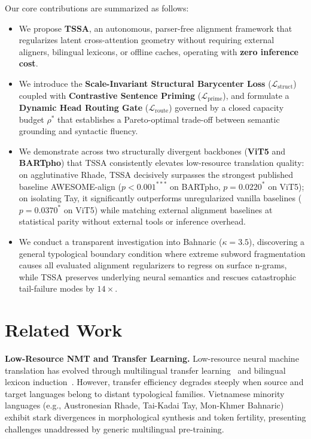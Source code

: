 \documentclass[11pt]{article}
\begin{document}
Our core contributions are summarized as follows:
\begin{itemize}[leftmargin=*]
    \item We propose \textbf{TSSA}, an autonomous, parser-free alignment framework that regularizes latent cross-attention geometry without requiring external aligners, bilingual lexicons, or offline caches, operating with \textbf{zero inference cost}.
    \item We introduce the \textbf{Scale-Invariant Structural Barycenter Loss} ($\mathcal{L}_{\text{struct}}$) coupled with \textbf{Contrastive Sentence Priming} ($\mathcal{L}_{\text{prime}}$), and formulate a \textbf{Dynamic Head Routing Gate} ($\mathcal{L}_{\text{route}}$) governed by a closed capacity budget $\rho^*$ that establishes a Pareto-optimal trade-off between semantic grounding and syntactic fluency.
    \item We demonstrate across two structurally divergent backbones (\textbf{ViT5} and \textbf{BARTpho}) that TSSA consistently elevates low-resource translation quality: on agglutinative Rhade, TSSA decisively surpasses the strongest published baseline AWESOME-align ($p < 0.001^{\ast\ast\ast}$ on BARTpho, $p = 0.0220^*$ on ViT5); on isolating Tay, it significantly outperforms unregularized vanilla baselines ($p = 0.0370^*$ on ViT5) while matching external alignment baselines at statistical parity without external tools or inference overhead.
    \item We conduct a transparent investigation into Bahnaric ($\kappa = 3.5$), discovering a general typological boundary condition where extreme subword fragmentation causes all evaluated alignment regularizers to regress on surface n-grams, while TSSA preserves underlying neural semantics and rescues catastrophic tail-failure modes by $14\times$.
\end{itemize}

\section{Related Work}
\label{sec:related_work}

\noindent\textbf{Low-Resource NMT and Transfer Learning.}\quad
Low-resource neural machine translation has evolved through multilingual transfer learning~\cite{liu-etal-2020-multilingual-denoising,raffel2020exploring} and bilingual lexicon induction~\cite{hu2024dm}. However, transfer efficiency degrades steeply when source and target languages belong to distant typological families. Vietnamese minority languages (e.g., Austronesian Rhade, Tai-Kadai Tay, Mon-Khmer Bahnaric) exhibit stark divergences in morphological synthesis and token fertility, presenting challenges unaddressed by generic multilingual pre-training.
\end{document}
